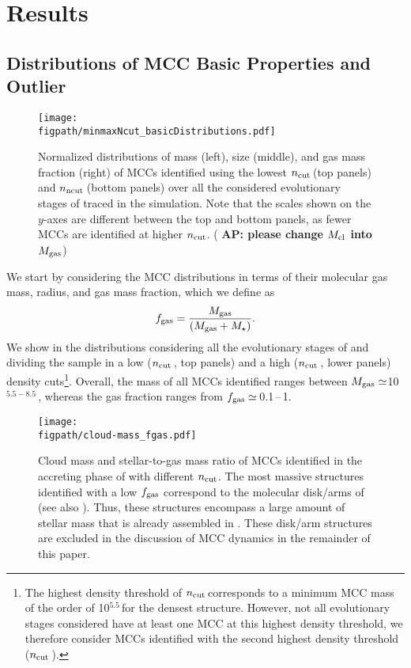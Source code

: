 \IfFileExists{emulateapjlegacy.cls}{\documentclass[iop]{emulateapjlegacy}}{\documentclass[iop]{emulateapj}}
\newcommand{\AP}[1]{({\bf \color{apcolor} AP: #1})}
\def\figpath{./Fig}
\begin{document}
\section{Results}\label{sec:results}

\subsection{Distributions of MCC Basic Properties and Outlier} \label{sec:dist}
\begin{figure*}[htbp]
\centering
\texttt{[image: \\figpath/minmaxNcut\_basicDistributions.pdf]}
\caption{Normalized distributions of mass (left), size (middle), and gas mass fraction (right) of MCCs identified using the lowest 
$n_{\rm cut}$\,\cc (top panels) and $n_{\rm ncut}$\,\cc (bottom panels) over all the considered evolutionary stages of \flower traced in the simulation. Note that the scales shown on the $y$-axes are different between the top and bottom panels, as fewer MCCs are identified at higher $n_{\rm cut}$. \AP{please change $M_{\rm cl}$ into $M_{\rm gas}$}
\label{fig:dist}}
\end{figure*}

We start by considering the MCC distributions in terms of their molecular gas mass, radius, and gas mass fraction, which we define as
\begin{equation}
f_{\rm gas} = \frac{M_{\rm gas}} {\left(M_{\rm gas} + M_\star\right)}.
\end{equation}
%
We show in  the distributions considering all the evolutionary stages of \flower and dividing the sample in a low 
($n_{\rm cut}$\,\cc, top panels) and a high ($n_{\rm cut}$\,\cc, lower panels) density cuts\footnote{The highest density threshold of $n_{\rm cut}$\,\cc corresponds to a minimum MCC mass of the order of 10$^{5.5}$\,\Msun for the densest structure. However, not all evolutionary stages considered have at least one MCC at this highest density threshold, we therefore consider MCCs identified with the second highest density threshold ($n_{\rm cut}$\,\cc).}.
%
Overall, the mass of all MCCs identified ranges between $M_{\rm gas}\simeq$10$^{5.5-8.5}$\,\Msun, 
whereas the gas fraction ranges from $f_{\rm gas} \simeq$\,0.1\,--\,1.

\begin{figure}
\centering
\texttt{[image: \\figpath/cloud-mass\_fgas.pdf]}
\caption{Cloud mass and stellar-to-gas mass ratio of MCCs identified in the accreting phase of \flower with different $n_{\rm cut}$. The most massive structures
identified with a low $f_{\rm gas}$ correspond to the molecular disk/arms of \flower (see also ).
%
Thus, these structures encompass a large amount of stellar mass that is already assembled in \flower. These disk/arm structures are excluded 
in the discussion of MCC dynamics in the remainder of this paper. 
\label{fig:stellarRatio16}}
\end{figure}
\end{document}
